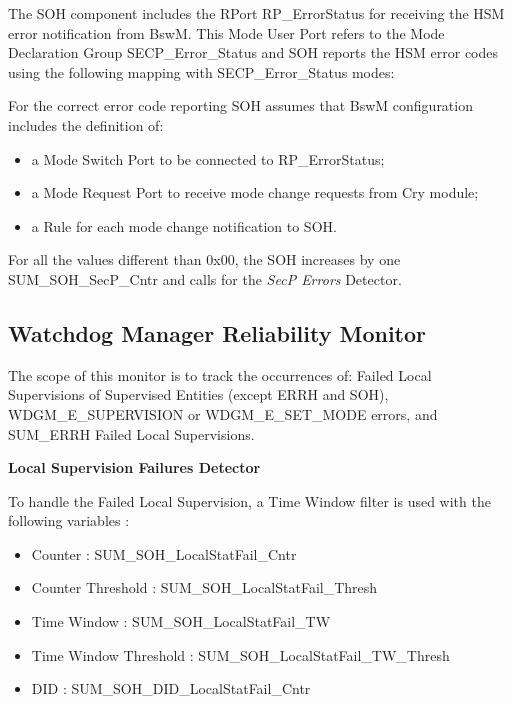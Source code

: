 {
The SOH component includes the RPort RP\_ErrorStatus for receiving the HSM error notification from BswM. This Mode User Port refers to the Mode Declaration Group SECP\_Error\_Status and SOH reports the HSM error codes using the following mapping with SECP\_Error\_Status modes:


For the correct error code reporting SOH assumes that BswM configuration includes the definition of:

\begin{itemize}
	\item a Mode Switch Port to be connected to RP\_ErrorStatus;
	\item a Mode Request Port to receive mode change requests from Cry module;
	\item a Rule for each mode change notification to SOH. 	
\end{itemize}

For all the values different than 0x00, the SOH increases by one SUM_SOH_SecP_Cntr and calls  for the \textit{SecP Errors} Detector.
}
{
 
}


\subsection{Watchdog Manager Reliability Monitor}
\label{subsec:wdgmreliabilitymonitor}

{
The scope of this monitor is to track the occurrences of: Failed Local Supervisions of Supervised Entities (except ERRH and SOH), WDGM\_E\_SUPERVISION or WDGM\_E\_SET\_MODE errors, and SUM\_ERRH Failed Local Supervisions.
}
{
    
}

{
    \textbf{Local Supervision Failures Detector}
    
    
    To handle the Failed Local Supervision, a Time Window filter is used  with the following variables :
    
    \begin{itemize}
        \item Counter               : SUM_SOH_LocalStatFail_Cntr
        \item Counter Threshold     : SUM_SOH_LocalStatFail_Thresh
        \item Time Window           : SUM_SOH_LocalStatFail_TW
        \item Time Window Threshold : SUM_SOH_LocalStatFail_TW_Thresh
        \item DID                   : SUM_SOH_DID_LocalStatFail_Cntr
    \end{itemize}
    
}
{
       
}

